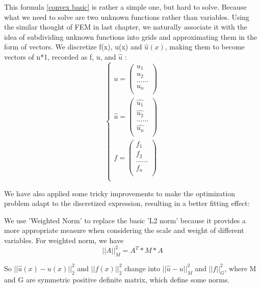 \documentclass{article}
\begin{document}
This formula \ref{convex basic} is rather a simple one, but hard to solve. Because what we need to solve are two unknown functions rather than variables. Using the similar thought of FEM in last chapter, we naturally associate it with the idea of subdividing unknown functions into grids and approximating them in the form of vectors. We discretize f(x), u(x) and $\hat{u}(x)$, making them to become vectors of n*1, recorded as f, u, and $\hat{u}$ :
\begin{equation}
\begin{cases}
    u = 
    \begin{pmatrix}
            u_1\\
            u_2\\
            ... ...\\
            u_n\\
    \end{pmatrix}\\
    \hat{u} = 
    \begin{pmatrix}
            \hat{u_1}\\
            \hat{u_2}\\
            ... ...\\
            \hat{u_n}\\
    \end{pmatrix}\\
    f = 
    \begin{pmatrix}
            f_1\\
            f_2\\
            ... ...\\
            f_n\\
    \end{pmatrix}\\
    
\end{cases}
\end{equation}


We have also applied some tricky improvements to make the optimization problem adapt to the discretized expression, resulting in a better fitting effect:

We use 'Weighted Norm' to replace the basic 'L2 norm' because it provides a more appropriate measure when considering the scale and weight of different variables. 
For weighted norm, we have 
\begin{equation}
||A||_M^2 = A^T*M*A
\end{equation}

So $||\hat{u}(x)-u(x)||^2_{2}$ and $||f(x)||^2_{2}$ change into $||\hat{u}-u||_M^2$ and $||f||_G^2$, where M and G are symmetric positive deﬁnite matrix, which define some norms. 
\end{document}
